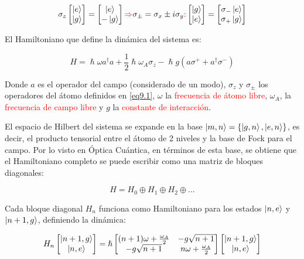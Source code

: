 \documentclass{book}
\begin{document}
 \begin{equation}\label{eq9.1} \sigma_z\begin{bmatrix}\ket{e}\\\ket{g}\end{bmatrix}=\begin{bmatrix}\ket{e}\\-\ket{g}\end{bmatrix}\textcolor{red}{\Rightarrow} \sigma_\pm=\sigma_x\pm i\sigma_y\textcolor{red}{:}\begin{bmatrix}\ket{g}\\\ket{e}\end{bmatrix}=\begin{bmatrix}\sigma_-\ket{e}\\\sigma_+\ket{g}\end{bmatrix}\end{equation}
 
El Hamiltoniano que define la dinámica del sistema es:

\begin{equation}\label{eq9.2}H=\hslash \omega a^\dag a+\frac{1}{2}\hslash\omega_A\sigma_z-\hslash g (a\sigma^++a^\dag \sigma^-)\end{equation}

Donde $a$ es el operador del campo (considerado de un modo), $\sigma_z$ y $\sigma_\pm$ los operadores del átomo definidos en \ref{eq9.1}, $\omega$ la \textcolor{red}{frecuencia de átomo libre}, $\omega_A$, la \textcolor{red}{frecuencia de campo libre} y $g$ la \textcolor{red}{constante de interacción}.

El espacio de Hilbert del sistema se expande en la base $\ket{m,n}=\{\ket{g,n},\ket{e,n}\}$, es decir, el producto tensorial entre el átomo de 2 niveles y la base de Fock para el campo. Por lo visto en Óptica Cuántica, en términos de esta base, se obtiene que el Hamiltoniano completo se puede escribir como una matriz de bloques diagonales:

\begin{equation}\label{eq9.3}H=H_0\oplus H_1\oplus H_2\oplus ...\end{equation}

Cada bloque diagonal $H_n$ funciona como Hamiltoniano para los estados $\ket{n,e}$ y $\ket{n+1,g}$, definiendo la dinámica:

\begin{equation}\label{eq9.4} H_n\begin{bmatrix}\ket{n+1,g}\\\ket{n,e}\end{bmatrix}=\hslash\begin{bmatrix}(n+1)\omega+\frac{\omega_A}{2}&-g\sqrt{n+1}\\-g\sqrt{n+1} &n\omega+\frac{\omega_A}{2}\end{bmatrix}\begin{bmatrix}\ket{n+1,g}\\\ket{n,e}\end{bmatrix}\end{equation}
\end{document}
